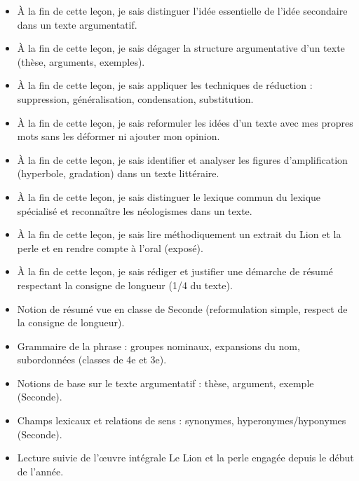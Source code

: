 \documentclass[11pt]{article}
\begin{document}
\begin{objectifs}
\begin{itemize}
\item À la fin de cette leçon, je sais distinguer l'idée essentielle de l'idée secondaire dans un texte argumentatif.
\item À la fin de cette leçon, je sais dégager la structure argumentative d'un texte (thèse, arguments, exemples).
\item À la fin de cette leçon, je sais appliquer les techniques de réduction : suppression, généralisation, condensation, substitution.
\item À la fin de cette leçon, je sais reformuler les idées d'un texte avec mes propres mots sans les déformer ni ajouter mon opinion.
\item À la fin de cette leçon, je sais identifier et analyser les figures d'amplification (hyperbole, gradation) dans un texte littéraire.
\item À la fin de cette leçon, je sais distinguer le lexique commun du lexique spécialisé et reconnaître les néologismes dans un texte.
\item À la fin de cette leçon, je sais lire méthodiquement un extrait du Lion et la perle et en rendre compte à l'oral (exposé).
\item À la fin de cette leçon, je sais rédiger et justifier une démarche de résumé respectant la consigne de longueur (1/4 du texte).
\end{itemize}
\end{objectifs}

\begin{prerequis}
\begin{itemize}
\item Notion de résumé vue en classe de Seconde (reformulation simple, respect de la consigne de longueur).
\item Grammaire de la phrase : groupes nominaux, expansions du nom, subordonnées (classes de 4e et 3e).
\item Notions de base sur le texte argumentatif : thèse, argument, exemple (Seconde).
\item Champs lexicaux et relations de sens : synonymes, hyperonymes/hyponymes (Seconde).
\item Lecture suivie de l'œuvre intégrale Le Lion et la perle engagée depuis le début de l'année.
\end{itemize}
\end{prerequis}

\newpage
\end{document}
